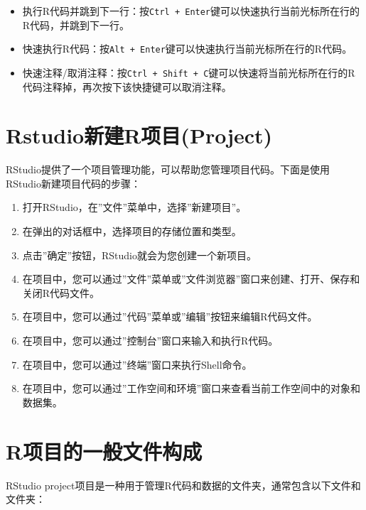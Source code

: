 \documentclass[
  letterpaper,
  DIV=11,
  numbers=noendperiod]{scrreprt}
\begin{document}
\begin{itemize}
\item
  执行R代码并跳到下一行：按\texttt{Ctrl\ +\ Enter}键可以快速执行当前光标所在行的R代码，并跳到下一行。
\item
  快速执行R代码：按\texttt{Alt\ +\ Enter}键可以快速执行当前光标所在行的R代码。
\item
  快速注释/取消注释：按\texttt{Ctrl\ +\ Shift\ +\ C}键可以快速将当前光标所在行的R代码注释掉，再次按下该快捷键可以取消注释。
\end{itemize}

\hypertarget{rstudioux65b0ux5efarux9879ux76eeproject}{%
\section{Rstudio新建R项目(Project)}\label{rstudioux65b0ux5efarux9879ux76eeproject}}

RStudio提供了一个项目管理功能，可以帮助您管理项目代码。下面是使用RStudio新建项目代码的步骤：

\begin{enumerate}
\def\labelenumi{\arabic{enumi}.}
\item
  打开RStudio，在''文件''菜单中，选择''新建项目''。
\item
  在弹出的对话框中，选择项目的存储位置和类型。
\item
  点击''确定''按钮，RStudio就会为您创建一个新项目。
\item
  在项目中，您可以通过''文件''菜单或''文件浏览器''窗口来创建、打开、保存和关闭R代码文件。
\item
  在项目中，您可以通过''代码''菜单或''编辑''按钮来编辑R代码文件。
\item
  在项目中，您可以通过''控制台''窗口来输入和执行R代码。
\item
  在项目中，您可以通过''终端''窗口来执行Shell命令。
\item
  在项目中，您可以通过''工作空间和环境''窗口来查看当前工作空间中的对象和数据集。
\end{enumerate}

\hypertarget{rux9879ux76eeux7684ux4e00ux822cux6587ux4ef6ux6784ux6210}{%
\section{R项目的一般文件构成}\label{rux9879ux76eeux7684ux4e00ux822cux6587ux4ef6ux6784ux6210}}

RStudio
project项目是一种用于管理R代码和数据的文件夹，通常包含以下文件和文件夹：
\end{document}
